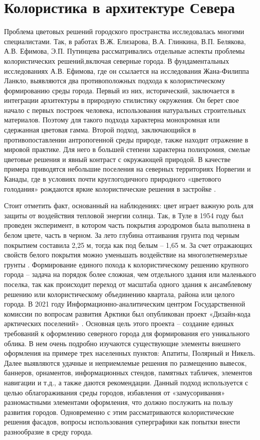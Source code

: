 \section{Колористика в архитектуре Севера}

Проблема цветовых решений городского пространства исследовалась многими специалистами.
Так, в работах В.Ж. Елизарова, В.А. Глинкина, В.П. Белякова, А.В. Ефимова, Э.П. Путинцева рассматривались отдельные аспекты проблемы колористических решений,включая северные города.
В фундаментальных исследованиях А.В. Ефимова, где он ссылается на исследования Жана-Филиппа Ланкло, выявляются два противоположных подхода к колористическому формированию среды города.
Первый из них, исторический, заключается в интеграции архитектуры в природную стилистику окружения. Он берет свое начало с первых построек человека,
использования натуральных строительных материалов. Поэтому для такого подхода характерна монохромная или сдержанная цветовая гамма.
Второй подход, заключающийся в противопоставлении антропогенной среды природе, также находит отражение в мировой практике.
Для него в большей степени характерна полихромия, смелые цветовые решения и явный контраст с окружающей природой.
В качестве примера приводятся небольшие поселения на северных территориях Норвегии и Канады, где в условиях почти круглогодичного природного «цветового голодания» рождаются
яркие колористические решения в застройке \Code{[52]}.

Стоит отметить факт, основанный на наблюдениях: цвет играет важную роль для защиты от воздействия тепловой энергии солнца.
Так, в Туле в 1954 году был проведен эксперимент, в котором часть покрытия аэродромов была выполнена в белом цвете, часть в черном.
За лето глубина оттаивания грунта под черным покрытием составила 2,25 м, тогда как под белым – 1,65 м.
За счет отражающих свойств белого покрытия можно уменьшать воздействие на многолетнемерзлые грунты \Code{[17, с. 44]}.
Формирование единого похода к колористическому решению крупного города – задача на порядок более сложная, чем отдельного здания или маленького поселка,
так как происходит переход от масштаба одного здания к ансамблевому решению или колористическому объединению квартала, района или целого города.
В 2021 году Информационно-аналитическим центром Государственной комиссии по вопросам развития Арктики был опубликован проект «Дизайн-кода арктических поселений» .
Основная цель этого проекта – создание единых требований к оформлению северного города для формирования его уникального облика.
В нем очень подробно изучаются существующие элементы внешнего оформления на примере трех населенных пунктов: Апатиты, Полярный и Никель.
Далее выявляются удачные и неприемлемые решения по размещению вывесок, баннеров, орнаментов, информационных стендов, памятных табличек, элементов навигации и т.д.,
а также даются рекомендации. Данный подход используется с целью облагораживания среды городов, избавления от «замусоривания» разномастными элементами оформления,
что должно послужить на пользу развития городов. Одновременно с этим рассматриваются колористические решения фасадов,
вопросы использования суперграфики как попытки внести разнообразие в среду города.

